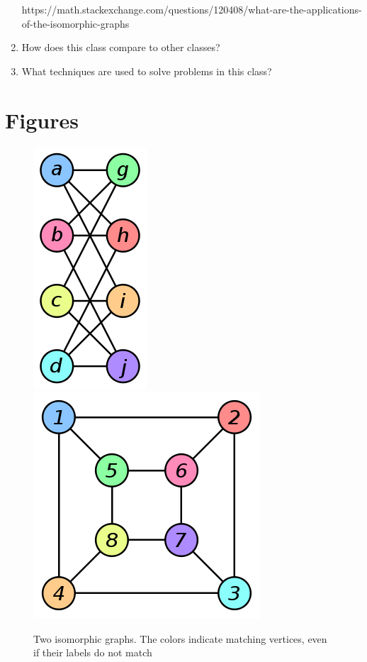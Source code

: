 \documentclass[letterpaper, 12pt]{article}
\begin{document}
\begin{enumerate}
    https://math.stackexchange.com/questions/120408/what-are-the-applications-of-the-isomorphic-graphs
    \item How does this class compare to other classes?
    \item What techniques are used to solve problems in this class?

\end{enumerate}
\section{Figures}
\begin{figure}[h]
    \label{graph-iso-image-figure}
    \caption{Two isomorphic graphs. The colors indicate matching vertices, even
    if their labels do not match~\cite{wikimedia-images}}
    \centering
    \includegraphics[scale=0.4]{graph-iso-a}
    \includegraphics[scale=0.4]{graph-iso-b}
\end{figure}

{}

\end{document}
